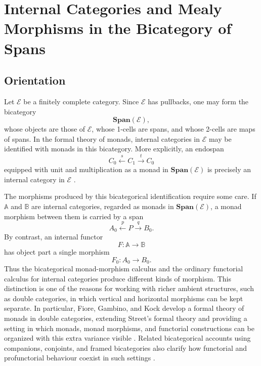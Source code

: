 \chapter{Internal Categories and Mealy Morphisms in the Bicategory of Spans}
\label{ch:spans-internal-categories-mealy}

\section{Orientation}
\label{sec:ch1-orientation}

Let \(\mathcal E\) be a finitely complete category. Since \(\mathcal E\) has pullbacks, one may form the bicategory
\[
    \mathbf{Span}(\mathcal E),
\]
whose objects are those of \(\mathcal E\), whose 1-cells are spans, and whose 2-cells are maps of spans. In the formal theory of monads, internal categories in \(\mathcal E\) may be identified with monads in this bicategory. More explicitly, an endospan
\[
    C_0 \xleftarrow{s} C_1 \xrightarrow{t} C_0
\]
equipped with unit and multiplication as a monad in \(\mathbf{Span}(\mathcal E)\) is precisely an internal category in \(\mathcal E\) \cite{BenabouBicategories,StreetFormalTheoryOfMonads,LackCompanion,MirandaInternalCategories}.

The morphisms produced by this bicategorical identification require some care. If \(\mathbb A\) and \(\mathbb B\) are internal categories, regarded as monads in \(\mathbf{Span}(\mathcal E)\), a monad morphism between them is carried by a span
\[
    A_0 \xleftarrow{p} P \xrightarrow{q} B_0.
\]
By contrast, an internal functor
\[
    F:\mathbb A\to\mathbb B
\]
has object part a single morphism
\[
    F_0:A_0\to B_0.
\]
Thus the bicategorical monad-morphism calculus and the ordinary functorial calculus for internal categories produce different kinds of morphism. This distinction is one of the reasons for working with richer ambient structures, such as double categories, in which vertical and horizontal morphisms can be kept separate. In particular, Fiore, Gambino, and Kock develop a formal theory of monads in double categories, extending Street's formal theory and providing a setting in which monads, monad morphisms, and functorial constructions can be organized with this extra variance visible \cite{StreetFormalTheoryOfMonads,FioreGambinoKockMonadsDoubleCategories}. Related bicategorical accounts using companions, conjoints, and framed bicategories also clarify how functorial and profunctorial behaviour coexist in such settings \cite{LackCompanion}.

